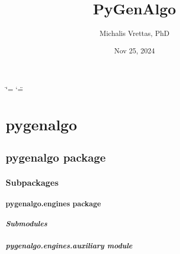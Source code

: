 \documentclass[letterpaper,10pt,english]{sphinxmanual}
\title{PyGenAlgo}
\date{Nov 25, 2024}
\author{Michalis Vrettas, PhD}
\begin{document}
\ifdefined\shorthandoff
  \ifnum\catcode`\=\string=\active\shorthandoff{=}\fi
  \ifnum\catcode`\"=\active{}\fi
\fi

\pagestyle{empty}
\sphinxmaketitle
\pagestyle{plain}
\sphinxtableofcontents
\pagestyle{normal}
\label{\detokenize{index::doc}}


\sphinxstepscope


\chapter{pygenalgo}
\label{\detokenize{modules:pygenalgo}}\label{\detokenize{modules::doc}}
\sphinxstepscope


\section{pygenalgo package}
\label{\detokenize{pygenalgo:pygenalgo-package}}\label{\detokenize{pygenalgo::doc}}

\subsection{Subpackages}
\label{\detokenize{pygenalgo:subpackages}}
\sphinxstepscope


\subsubsection{pygenalgo.engines package}
\label{\detokenize{pygenalgo.engines:pygenalgo-engines-package}}\label{\detokenize{pygenalgo.engines::doc}}

\paragraph{Submodules}
\label{\detokenize{pygenalgo.engines:submodules}}

\paragraph{pygenalgo.engines.auxiliary module}
\label{\detokenize{pygenalgo.engines:module-pygenalgo.engines.auxiliary}}\label{\detokenize{pygenalgo.engines:pygenalgo-engines-auxiliary-module}}
\end{document}

